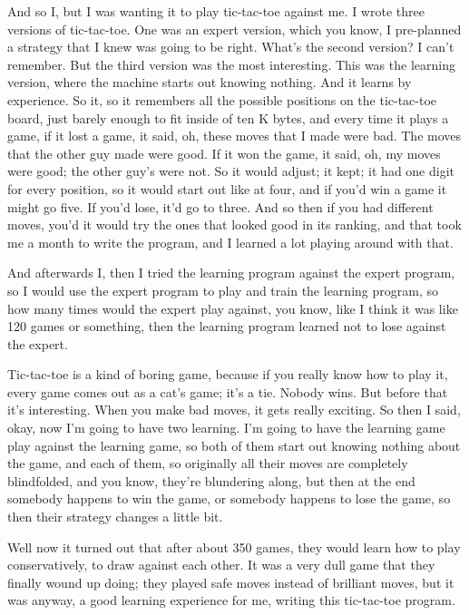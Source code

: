 \documentclass[]{article}
\begin{document}
And so I, but I was wanting it to play tic-tac-toe against me. I wrote
three versions of tic-tac-toe. One was an expert version, which you
know, I pre-planned a strategy that I knew was going to be right. What's
the second version? I can't remember. But the third version was the most
interesting. This was the learning version, where the machine starts out
knowing nothing. And it learns by experience. So it, so it remembers all
the possible positions on the tic-tac-toe board, just barely enough to
fit inside of ten K bytes, and every time it plays a game, if it lost a
game, it said, oh, these moves that I made were bad. The moves that the
other guy made were good. If it won the game, it said, oh, my moves were
good; the other guy's were not. So it would adjust; it kept; it had one
digit for every position, so it would start out like at four, and if
you'd win a game it might go five. If you'd lose, it'd go to three. And
so then if you had different moves, you'd it would try the ones that
looked good in its ranking, and that took me a month to write the
program, and I learned a lot playing around with that.

And afterwards I, then I tried the learning program against the expert
program, so I would use the expert program to play and train the
learning program, so how many times would the expert play against, you
know, like I think it was like 120 games or something, then the learning
program learned not to lose against the expert.

Tic-tac-toe is a kind of boring game, because if you really know how to
play it, every game comes out as a cat's game; it's a tie. Nobody wins.
But before that it's interesting. When you make bad moves, it gets
really exciting. So then I said, okay, now I'm going to have two
learning. I'm going to have the learning game play against the learning
game, so both of them start out knowing nothing about the game, and each
of them, so originally all their moves are completely blindfolded, and
you know, they're blundering along, but then at the end somebody happens
to win the game, or somebody happens to lose the game, so then their
strategy changes a little bit.

Well now it turned out that after about 350 games, they would learn how
to play conservatively, to draw against each other. It was a very dull
game that they finally wound up doing; they played safe moves instead of
brilliant moves, but it was anyway, a good learning experience for me,
writing this tic-tac-toe program.
\end{document}
